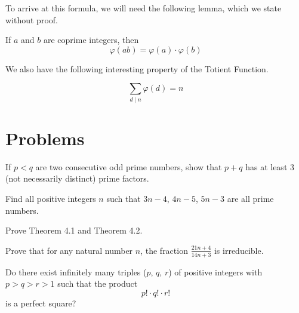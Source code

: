 \documentclass{article}
\theoremstyle{mytheoremstyle}
\theoremstyle{mytheoremstyle}
\theoremstyle{myproblemstyle}
\theoremstyle{myproblemstyle}
\theoremstyle{myproblemstyle}
\begin{document}
    To arrive at this formula, we will need the following lemma, which we state without proof. 
    
    \begin{theorem}
        If $a$ and $b$ are coprime integers, then 
        \[
        \varphi(ab) = \varphi(a) \cdot \varphi(b)
        \]
    \end{theorem}


    \vspace{5pt}

    We also have the following interesting property of the Totient Function.
    \begin{theorem}[Gauss]
        $$\displaystyle\sum_{d \mid n}{} \varphi(d) = n$$     
    \end{theorem}
    
    \section{Problems}
    \begin{problem}
        If $p < q$ are two consecutive odd prime numbers, show that $p + q$ has at least 3 (not necessarily distinct) prime factors. 
    \end{problem}

    \begin{problem}
        Find all positive integers $n$ such that $3n-4$, $4n-5$, $5n-3$ are all prime numbers.
    \end{problem}


    \begin{problem}
        Prove Theorem 4.1 and Theorem 4.2.
    \end{problem}
    \begin{problem}[IMO 1959/1] 
        Prove that for any natural number $n$, the fraction $\frac{21n + 4}{14n+3}$ is irreducible.
    \end{problem}

    \begin{problem}[NZMO 2023]
        Do there exist infinitely many triples ($p$, $q$, $r$) of positive integers with $p > q > r > 1$ such that the product \[p! \cdot q! \cdot r!\] is a perfect square?
    \end{problem}
\end{document}
